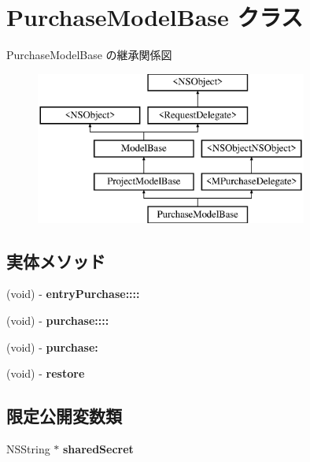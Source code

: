 \hypertarget{interface_purchase_model_base}{}\section{Purchase\+Model\+Base クラス}
\label{interface_purchase_model_base}
Purchase\+Model\+Base の継承関係図\begin{figure}[H]
\begin{center}
\leavevmode
\includegraphics[height=5.000000cm]{interface_purchase_model_base}
\end{center}
\end{figure}
\subsection*{実体メソッド}
\begin{DoxyCompactItemize}
\item 
\hypertarget{interface_purchase_model_base_a367c940f37acb7a41892ac0a0be586ad}{}(void) -\/ {\bfseries entry\+Purchase\+::::}\label{interface_purchase_model_base_a367c940f37acb7a41892ac0a0be586ad}

\item 
\hypertarget{interface_purchase_model_base_a190c9a50495ebd110ebdbe6df987e05f}{}(void) -\/ {\bfseries purchase\+::::}\label{interface_purchase_model_base_a190c9a50495ebd110ebdbe6df987e05f}

\item 
\hypertarget{interface_purchase_model_base_a8954051bfeffcd22bc13f2cac52004a3}{}(void) -\/ {\bfseries purchase\+:}\label{interface_purchase_model_base_a8954051bfeffcd22bc13f2cac52004a3}

\item 
\hypertarget{interface_purchase_model_base_aee9dfbe639d828e1e86af9fb00356402}{}(void) -\/ {\bfseries restore}\label{interface_purchase_model_base_aee9dfbe639d828e1e86af9fb00356402}

\end{DoxyCompactItemize}
\subsection*{限定公開変数類}
\begin{DoxyCompactItemize}
\item 
\hypertarget{interface_purchase_model_base_a38bbb087ec1cb65532f3661ba85efd17}{}N\+S\+String $\ast$ {\bfseries shared\+Secret}\label{interface_purchase_model_base_a38bbb087ec1cb65532f3661ba85efd17}

\end{DoxyCompactItemize}
